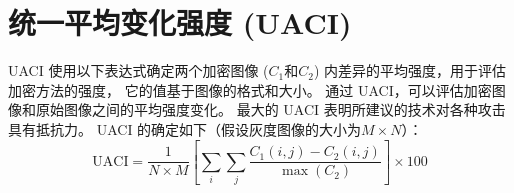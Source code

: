 \section{统一平均变化强度 (UACI)}

UACI 使用以下表达式确定两个加密图像 ($C_1$和$C_2$) 内差异的平均强度，用于评估加密方法的强度，
它的值基于图像的格式和大小。 
通过 UACI，可以评估加密图像和原始图像之间的平均强度变化。 
最大的 UACI 表明所建议的技术对各种攻击具有抵抗力。 
UACI 的确定如下（假设灰度图像的大小为$M\times N$）\citep{ying2004digital}：
\begin{equation}
    \text{UACI}=\frac{1}{N\times M}\left[\sum_{i}\sum_{j}\frac{C_1(i,j)-C_2(i,j)}{\max(C_2)}\right]\times 100
\end{equation}